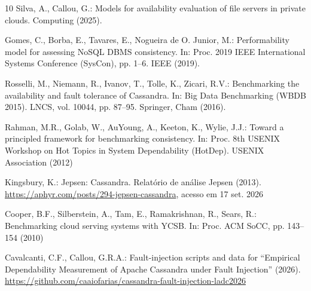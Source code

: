 \documentclass[runningheads]{llncs}
\begin{document}
\begin{thebibliography}{10}
Silva, A., Callou, G.: Models for availability evaluation of file servers in
private clouds. Computing (2025).

Gomes, C., Borba, E., Tavares, E., Nogueira de O. Junior, M.: Performability
model for assessing NoSQL DBMS consistency. In: Proc. 2019 IEEE International
Systems Conference (SysCon), pp. 1--6. IEEE (2019).

Rosselli, M., Niemann, R., Ivanov, T., Tolle, K., Zicari, R.V.: Benchmarking the
availability and fault tolerance of Cassandra. In: Big Data Benchmarking (WBDB
2015). LNCS, vol. 10044, pp. 87--95. Springer, Cham (2016).

Rahman, M.R., Golab, W., AuYoung, A., Keeton, K., Wylie, J.J.: Toward a
principled framework for benchmarking consistency. In: Proc. 8th USENIX Workshop
on Hot Topics in System Dependability (HotDep). USENIX Association (2012)

Kingsbury, K.: Jepsen: Cassandra. Relatório de análise Jepsen (2013).
\url{https://aphyr.com/posts/294-jepsen-cassandra}, acesso em 17 set. 2026

Cooper, B.F., Silberstein, A., Tam, E., Ramakrishnan, R., Sears, R.:
Benchmarking cloud serving systems with YCSB. In: Proc. ACM SoCC, pp. 143--154
(2010)

Cavalcanti, C.F., Callou, G.R.A.: Fault-injection scripts and data for
``Empirical Dependability Measurement of Apache Cassandra under Fault
Injection'' (2026).
\url{https://github.com/caaiofarias/cassandra-fault-injection-ladc2026}

\end{thebibliography}
\end{document}
